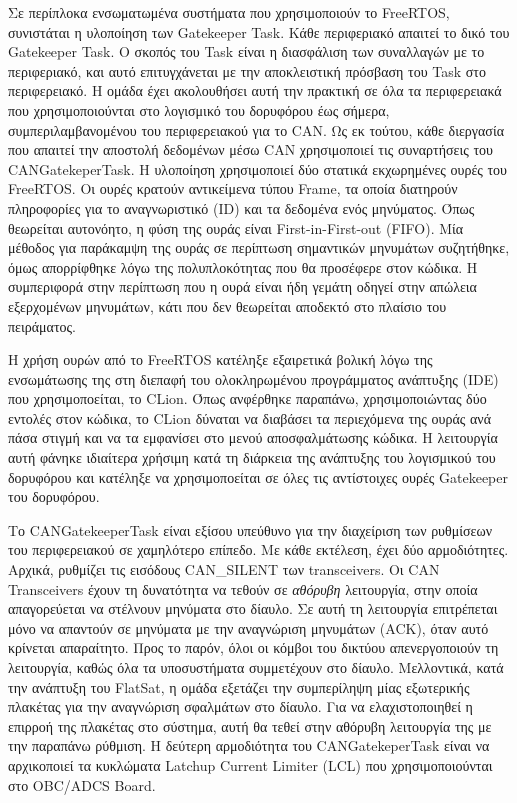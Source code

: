 \documentclass[a4paper,nobib,justified]{tufte-book}
\begin{document}
Σε περίπλοκα ενσωματωμένα συστήματα που χρησιμοποιούν το FreeRTOS, συνιστάται η υλοποίηση των Gatekeeper Task. Κάθε περιφεριακό απαιτεί το δικό του Gatekeeper Task. Ο σκοπός του Task είναι η διασφάλιση των συναλλαγών με το περιφεριακό, και αυτό επιτυγχάνεται με την αποκλειστική πρόσβαση του Task στο περιφερειακό. Η ομάδα έχει ακολουθήσει αυτή την πρακτική σε όλα τα περιφερειακά που χρησιμοποιούνται στο λογισμικό του δορυφόρου έως σήμερα, συμπεριλαμβανομένου του περιφερειακού για το CAN. Ως εκ τούτου, κάθε διεργασία που απαιτεί την αποστολή δεδομένων μέσω CAN χρησιμοποιεί τις συναρτήσεις του CANGatekeperTask. Η υλοποίηση χρησιμοποιεί δύο στατικά εκχωρημένες ουρές του FreeRTOS. Οι ουρές κρατούν αντικείμενα τύπου Frame, τα οποία διατηρούν πληροφορίες για το αναγνωριστικό (ID) και τα δεδομένα ενός μηνύματος. Όπως θεωρείται αυτονόητο, η φύση της ουράς είναι First-in-First-out (FIFO). Μία μέθοδος για παράκαμψη της ουράς σε περίπτωση σημαντικών μηνυμάτων συζητήθηκε, όμως απορρίφθηκε λόγω της πολυπλοκότητας που θα προσέφερε στον κώδικα. Η συμπεριφορά στην περίπτωση που η ουρά είναι ήδη γεμάτη οδηγεί στην απώλεια εξερχομένων μηνυμάτων, κάτι που δεν θεωρείται αποδεκτό στο πλαίσιο του πειράματος.

\par Η χρήση ουρών από το FreeRTOS κατέληξε εξαιρετικά βολική λόγω της ενσωμάτωσης της στη διεπαφή του ολοκληρωμένου προγράμματος ανάπτυξης (IDE) που χρησιμοποείται, το CLion. Όπως ανφέρθηκε παραπάνω, χρησιμοποιώντας δύο εντολές στον κώδικα, το CLion δύναται να διαβάσει τα περιεχόμενα της ουράς ανά πάσα στιγμή και να τα εμφανίσει στο μενού αποσφαλμάτωσης κώδικα. Η λειτουργία αυτή φάνηκε ιδιαίτερα χρήσιμη κατά τη διάρκεια της ανάπτυξης του λογισμικού του δορυφόρου και κατέληξε να χρησιμοποείται σε όλες τις αντίστοιχες ουρές Gatekeeper του δορυφόρου.


\par Το CANGatekeeperTask είναι εξίσου υπεύθυνο για την διαχείριση των ρυθμίσεων του περιφερειακού σε χαμηλότερο επίπεδο. Με κάθε εκτέλεση, έχει δύο αρμοδιότητες. Αρχικά, ρυθμίζει τις εισόδους CAN\_SILENT των transceivers. Οι CAN Transceivers έχουν τη δυνατότητα να τεθούν σε \textit{αθόρυβη} λειτουργία, στην οποία απαγορεύεται να στέλνουν μηνύματα στο δίαυλο. Σε αυτή τη λειτουργία επιτρέπεται μόνο να απαντούν σε μηνύματα με την αναγνώριση μηνυμάτων (ACK), όταν αυτό κρίνεται απαραίτητο. Προς το παρόν, όλοι οι κόμβοι του δικτύου απενεργοποιούν τη λειτουργία, καθώς όλα τα υποσυστήματα συμμετέχουν στο δίαυλο. Μελλοντικά, κατά την ανάπτυξη του FlatSat, η ομάδα εξετάζει την συμπερίληψη μίας εξωτερικής πλακέτας για την αναγνώριση σφαλμάτων στο δίαυλο. Για να ελαχιστοποιηθεί η επιρροή της πλακέτας στο σύστημα, αυτή θα τεθεί στην αθόρυβη λειτουργία της με την παραπάνω ρύθμιση. Η δεύτερη αρμοδιότητα του CANGatekeperTask είναι να αρχικοποιεί τα κυκλώματα Latchup Current Limiter (LCL) που χρησιμοποιούνται στο OBC/ADCS Board. 
\end{document}
